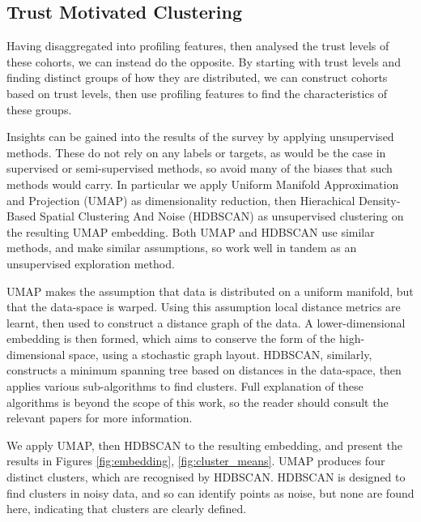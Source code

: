 \documentclass[manuscript,screen,review]{acmart}
\begin{document}
\subsection{Trust Motivated Clustering}

Having disaggregated into profiling features, then analysed the trust levels of these cohorts, we can instead do the opposite. By starting with trust levels and finding distinct groups of how they are distributed, we can construct cohorts based on trust levels, then use profiling features to find the characteristics of these groups.

Insights can be gained into the results of the survey by applying unsupervised methods. These do not rely on any labels or targets, as would be the case in supervised or semi-supervised methods, so avoid many of the biases that such methods would carry. In particular we apply Uniform Manifold Approximation and Projection (UMAP) \cite{McInnes2018} as dimensionality reduction, then Hierachical Density-Based Spatial Clustering And Noise (HDBSCAN) \cite{McInnes2017} as unsupervised clustering on the resulting UMAP embedding. Both UMAP and HDBSCAN use similar methods, and make similar assumptions, so work well in tandem as an unsupervised exploration method.

UMAP makes the assumption that data is distributed on a uniform manifold, but that the data-space is warped. Using this assumption local distance metrics are learnt, then used to construct a distance graph of the data. A lower-dimensional embedding is then formed, which aims to conserve the form of the high-dimensional space, using a stochastic graph layout. HDBSCAN, similarly, constructs a minimum spanning tree based on distances in the data-space, then applies various sub-algorithms to find clusters. Full explanation of these algorithms is beyond the scope of this work, so the reader should consult the relevant papers for more information. 

We apply UMAP, then HDBSCAN to the resulting embedding, and present the results in Figures \ref{fig:embedding}, \ref{fig:cluster_means}. UMAP produces four distinct clusters, which are recognised by HDBSCAN. HDBSCAN is designed to find clusters in noisy data, and so can identify points as noise, but none are found here, indicating that clusters are clearly defined.
\end{document}
